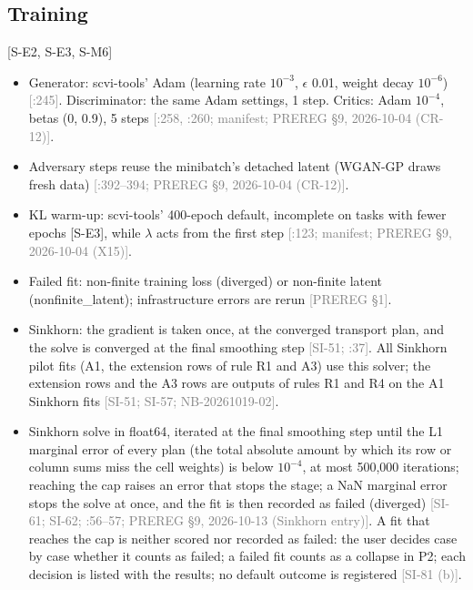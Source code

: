 \documentclass[11pt]{article}
\newcommand{\src}[1]{{\scriptsize\textcolor{gray}{[#1]}}}
\begin{document}
\subsection{Training}
[S-E2, S-E3, S-M6]
\begin{itemize}
\item Generator: scvi-tools' Adam (learning rate $10^{-3}$, $\epsilon$ 0.01, weight decay $10^{-6}$) \src{:245}. Discriminator: the same Adam settings, 1 step. Critics: Adam $10^{-4}$, betas (0, 0.9), 5 steps \src{:258, :260; manifest; PREREG \S9, 2026-10-04 (CR-12)}.
\item Adversary steps reuse the minibatch's detached latent (WGAN-GP draws fresh data) \src{:392--394; PREREG \S9, 2026-10-04 (CR-12)}.
\item KL warm-up: scvi-tools' 400-epoch default, incomplete on tasks with fewer epochs [S-E3], while $\lambda$ acts from the first step \src{:123; manifest; PREREG \S9, 2026-10-04 (X15)}.
\item Failed fit: non-finite training loss (diverged) or non-finite latent (nonfinite\_latent); infrastructure errors are rerun \src{PREREG \S1}.
\item Sinkhorn: the gradient is taken once, at the converged transport plan, and the solve is converged at the final smoothing step \src{SI-51; :37}. All Sinkhorn pilot fits (A1, the extension rows of rule R1 and A3) use this solver; the extension rows and the A3 rows are outputs of rules R1 and R4 on the A1 Sinkhorn fits \src{SI-51; SI-57; NB-20261019-02}.
\item Sinkhorn solve in float64, iterated at the final smoothing step until the L1 marginal error of every plan (the total absolute amount by which its row or column sums miss the cell weights) is below $10^{-4}$, at most 500,000 iterations; reaching the cap raises an error that stops the stage; a NaN marginal error stops the solve at once, and the fit is then recorded as failed (diverged) \src{SI-61; SI-62; :56--57; PREREG \S9, 2026-10-13 (Sinkhorn entry)}. A fit that reaches the cap is neither scored nor recorded as failed: the user decides case by case whether it counts as failed; a failed fit counts as a collapse in P2; each decision is listed with the results; no default outcome is registered \src{SI-81 (b)}.
\end{itemize}
\end{document}
